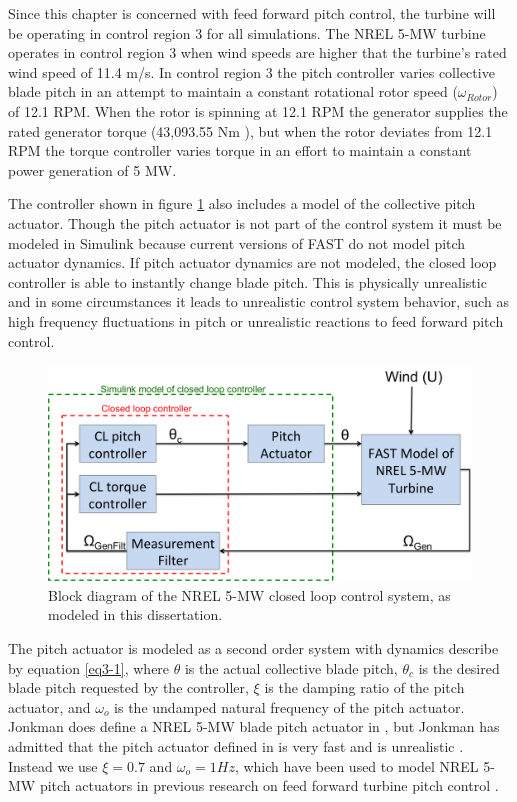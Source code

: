Since this chapter is concerned with feed forward pitch control, the turbine will be operating in control region 3 for all simulations. The NREL 5-MW turbine operates in control region 3 when wind speeds are higher that the turbine's rated wind speed of 11.4 m/s. In control region 3 the pitch controller varies collective blade pitch in an attempt to maintain a constant rotational rotor speed ($\omega_{Rotor}$) of 12.1 RPM. When the rotor is spinning at 12.1 RPM the generator supplies the rated generator torque (43,093.55 Nm ), but when the rotor deviates from 12.1 RPM the torque controller varies torque in an effort to maintain a constant power generation of 5 MW. 

The controller shown in figure \ref{fig3-9} also includes a model of the collective pitch actuator. Though the pitch actuator is not part of the control system it must be modeled in Simulink because current versions of FAST do not model pitch actuator dynamics. If pitch actuator dynamics are not modeled, the closed loop controller is able to instantly change blade pitch. This is physically unrealistic and in some circumstances it leads to unrealistic control system behavior, such as high frequency fluctuations in pitch or unrealistic reactions to feed forward pitch control.

 \begin{figure}[htbp]
	\centering
		\includegraphics[width=\linewidth]{Figures/ch3Figures/fig3-9.png}
		
	\caption{Block diagram of the NREL 5-MW closed loop control system, as modeled in this dissertation.}
	\label{fig3-9}
\end{figure}

The pitch actuator is modeled as a second order system with dynamics describe by equation \ref{eq3-1}, where  $\theta$  is the actual collective blade pitch, $\theta_c$ is the desired blade pitch requested by the controller, $\xi$ is the damping ratio of the pitch actuator, and $\omega_o$ is the undamped natural frequency of the pitch actuator. Jonkman does define a NREL 5-MW blade pitch actuator in \cite{jonkman2009}, but Jonkman has admitted that the pitch actuator defined in \cite{jonkman2009} is very fast and is unrealistic \cite{jonkman2014}. Instead we use $\xi = 0.7$ and $\omega_o = 1Hz$, which have been used to model NREL 5-MW pitch actuators in previous research on feed forward turbine pitch control \cite{dunne2011,dunne2012}. 

